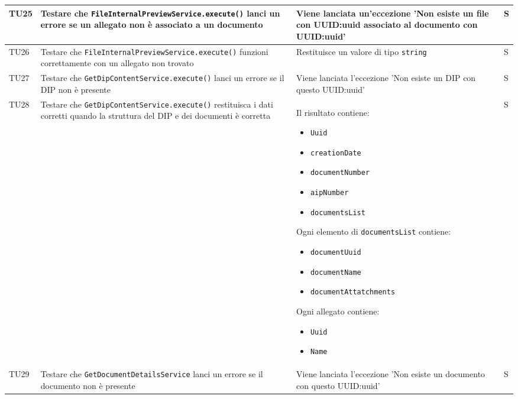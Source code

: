 \documentclass[a4paper,12pt]{article}
\begin{document}
\begin{longtable}{|M{1.2cm}|M{5cm}|M{5cm}|M{1.5cm}|}
            TU25 & Testare che \texttt{FileInternalPreviewService.execute()} lanci un errore se un allegato non è associato a un documento & Viene lanciata un'eccezione 'Non esiste un file con UUID:uuid associato al documento con UUID:uuid' & S \\
            \hline

            TU26 & Testare che \texttt{FileInternalPreviewService.execute()} funzioni correttamente con un allegato non trovato & Restituisce un valore di tipo \texttt{string} & S \\
            \hline

            TU27 & Testare che \texttt{GetDipContentService.execute()} lanci un errore se il DIP non è presente & Viene lanciata l'eccezione 'Non esiste un DIP con questo UUID:uuid' & S \\
            \hline

            TU28 & Testare che \texttt{GetDipContentService.execute()} restituisca i dati corretti quando la struttura del DIP e dei documenti è corretta & Il risultato contiene:
            \begin{itemize}[leftmargin=*]
                \item \texttt{Uuid}
                \item \texttt{creationDate}
                \item \texttt{documentNumber}
                \item \texttt{aipNumber}
                \item \texttt{documentsList}
            \end{itemize} Ogni elemento di \texttt{documentsList} contiene:
            \begin{itemize}[leftmargin=*]
                \item \texttt{documentUuid}
                \item \texttt{documentName}
                \item \texttt{documentAttatchments}
            \end{itemize} Ogni allegato contiene:
            \begin{itemize}[leftmargin=*]
                \item \texttt{Uuid}
                \item \texttt{Name}
            \end{itemize} & S \\
            \hline

            TU29 & Testare che \texttt{GetDocumentDetailsService} lanci un errore se il documento non è presente & Viene lanciata l'eccezione 'Non esiste un documento con questo UUID:uuid' & S \\
            \hline


\end{longtable}
\end{document}
